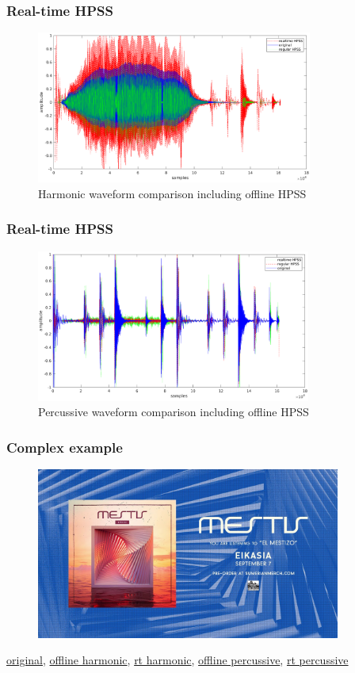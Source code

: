 \documentclass{beamer}
\begin{document}
\begin{frame}
	\frametitle{Real-time HPSS}
	\begin{figure}
	\includegraphics[height=5cm]{../images/harm_3way.png}
		\caption{Harmonic waveform comparison including offline HPSS}
	\end{figure}
\end{frame}

\begin{frame}
	\frametitle{Real-time HPSS}
	\begin{figure}
	\includegraphics[height=5cm]{../images/perc_3way.png}
		\caption{Percussive waveform comparison including offline HPSS}
	\end{figure}
\end{frame}

\begin{frame}
	\frametitle{Complex example}
	\begin{figure}
	\includegraphics[width=10cm]{../images/mestis_el_mestizo.jpg}
	\end{figure}
	\href{run:../audio/mestis_el_mestizo_shorter.wav}{original}, 
	\href{run:../audio/mestis_harm_offline_shorter.wav}{offline harmonic},
	\href{run:../audio/mestis_harm_rt_shorter.wav}{rt harmonic},
	\href{run:../audio/mestis_perc_offline_shorter.wav}{offline percussive},
	\href{run:../audio/mestis_perc_rt_shorter.wav}{rt percussive}
\end{frame}
\end{document}
